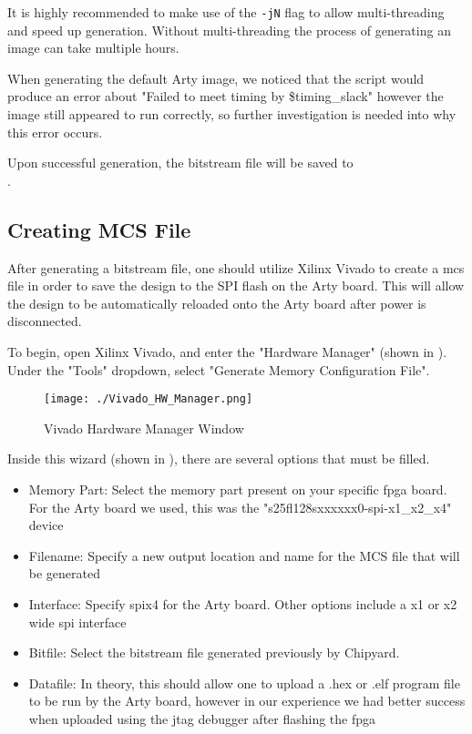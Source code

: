 	It is highly recommended to make use of the \texttt{-jN} flag to allow multi-threading and speed up generation. Without multi-threading the process of generating an image can take multiple hours.
	
	When generating the default Arty image, we noticed that the script would produce an error about "Failed to meet timing by \$timing\_slack" however the image still appeared to run correctly, so further investigation is needed into why this error occurs.
	
	Upon successful generation, the bitstream file will be saved to \\ . 
	
\subsection{Creating MCS File}\label{sec:Creating_MCS_file}
	After generating a bitstream file, one should utilize Xilinx Vivado to create a \gls{mcs} file in order to save the design to the SPI flash on the Arty board. This will allow the design to be automatically reloaded onto the Arty board after power is disconnected.
	
	To begin, open Xilinx Vivado, and enter the "Hardware Manager" (shown in ). Under the "Tools" dropdown, select "Generate Memory Configuration File".
	\begin{figure}[h!tbp]
		\centering
		\texttt{[image: ./Vivado\_HW\_Manager.png]}
		\caption{Vivado Hardware Manager Window}
		\label{fig:Vivado_HW_Manager}
	\end{figure}

	Inside this wizard (shown in ), there are several options that must be filled.
	\begin{itemize}
		\item Memory Part: Select the memory part present on your specific \Gls{fpga} board. For the Arty board we used, this was the "s25fl128sxxxxxx0-spi-x1\_x2\_x4" device
		\item Filename: Specify a new output location and name for the MCS file that will be generated
		\item Interface: Specify \Gls{spi}x4 for the Arty board. Other options include a x1 or x2 wide \Gls{spi} interface
		\item Bitfile: Select the bitstream file generated previously by Chipyard.
		\item Datafile: In theory, this should allow one to upload a .hex or .elf program file to be run by the Arty board, however in our experience we had better success when uploaded using the \Gls{jtag} debugger after flashing the \Gls{fpga}
	\end{itemize}

